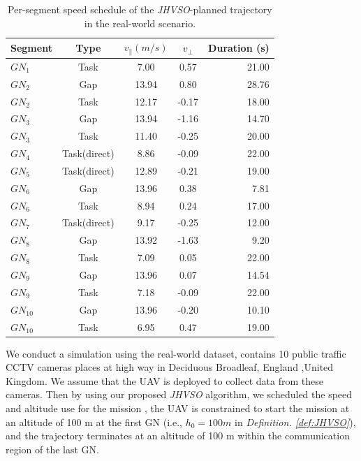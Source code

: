 \begin{table}%
\caption{Per-segment speed schedule of the \textit{JHVSO}-planned trajectory in the real-world scenario.}\label{tbl2}
\begin{tabular*}{\tblwidth}{lcccr}
\toprule
 Segment & Type & $v_\parallel (m/s)$ & $v_\perp$ & Duration (s) \\ %
\midrule
$GN_1$ & Task  & 7.00  & 0.57  & 21.00\\
$GN_2$ & Gap   & 13.94 & 0.80  & 28.76\\
$GN_2$ & Task  & 12.17 & -0.17 & 18.00\\
$GN_3$ & Gap   & 13.94 & -1.16 & 14.70\\
$GN_3$ & Task  & 11.40 & -0.25 & 20.00\\
$GN_4$ & Task(direct)  & 8.86  & -0.09 & 22.00\\
$GN_5$ & Task(direct)  & 12.89 & -0.21 & 19.00\\
$GN_6$ & Gap   & 13.96 & 0.38  & 7.81 \\
$GN_6$ & Task  & 8.94  & 0.24  & 17.00 \\
$GN_7$ & Task(direct)  & 9.17  & -0.25 & 12.00 \\
$GN_8$ & Gap   & 13.92 & -1.63 & 9.20 \\
$GN_8$ & Task  & 7.09  & 0.05  & 22.00 \\
$GN_9$ & Gap   & 13.96 & 0.07  & 14.54 \\
$GN_9$ & Task  & 7.18  & -0.09 & 22.00 \\
$GN_{10}$ & Gap   & 13.96 & -0.20 & 10.10 \\
$GN_{10}$ & Task  & 6.95  & 0.47 & 19.00 \\
\bottomrule
\end{tabular*}
\end{table}

We conduct a simulation using the real-world dataset, contains 10 public traffic CCTV cameras places at high way in Deciduous Broadleaf, England ,United Kingdom.
We assume that the UAV is deployed to collect data from these cameras.
Then by using our proposed \textit{JHVSO} algorithm, we scheduled the speed and altitude use for the mission , the UAV is constrained to start the mission at an altitude of 100 m at the first GN (i.e., $h_{0} = 100m$ in \textit{Definition. \ref{def:JHVSO}}), and the trajectory terminates at an altitude of 100 m within the communication region of the last GN.

